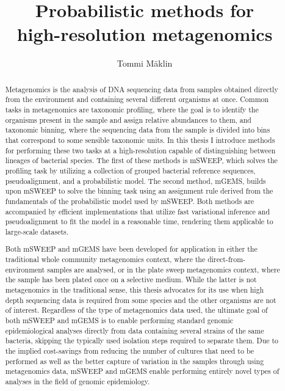 \documentclass[officiallayout]{tktla}
\title{Probabilistic methods for \\ high-resolution metagenomics}
\author{Tommi M\"aklin}
\begin{document}
\frontmatter

\maketitle

\begin{abstract}
  Metagenomics is the analysis of DNA sequencing data from samples
  obtained directly from the environment and containing several
  different organisms at once. Common tasks in metagenomics are
  taxonomic profiling, where the goal is to identify the organisms
  present in the sample and assign relative abundances to them, and
  taxonomic binning, where the sequencing data from the sample is
  divided into bins that correspond to some sensible taxonomic
  units. In this thesis I introduce methods for performing these two
  tasks at a high-resolution capable of distinguishing between
  lineages of bacterial species. The first of these methods is mSWEEP,
  which solves the profiling task by utilizing a collection of grouped
  bacterial reference sequences, pseudoalignment, and a probabilistic
  model. The second method, mGEMS, builds upon mSWEEP to solve the
  binning task using an assignment rule derived from the fundamentals
  of the probabilistic model used by mSWEEP. Both methods are
  accompanied by efficient implementations that utilize fast
  variational inference and pseudoalignment to fit the model in a
  reasonable time, rendering them applicable to large-scale
  datasets.

  Both mSWEEP and mGEMS have been developed for application in either
  the traditional whole community metagenomics context, where the
  direct-from-environment samples are analysed, or in the plate sweep
  metagenomics context, where the sample has been plated once on a
  selective medium. While the latter is not metagenomics in the
  traditional sense, this thesis advocates for its use when high depth
  sequencing data is required from some species and the other
  organisms are not of interest. Regardless of the type of
  metagenomics data used, the ultimate goal of both mSWEEP and mGEMS
  is to enable performing standard genomic epidemiological analyses
  directly from data containing several strains of the same bacteria,
  skipping the typically used isolation steps required to separate
  them. Due to the implied cost-savings from reducing the number of
  cultures that need to be performed as well as the better capture of
  variation in the samples through using metagenomics data, mSWEEP and
  mGEMS enable performing entirely novel types of analyses in the
  field of genomic epidemiology.

\end{abstract}
\end{document}

